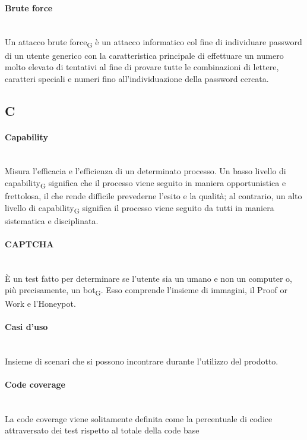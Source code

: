 \paragraph{Brute force}~\smallskip \\
Un attacco brute force\textsubscript{G} è un attacco informatico col fine di individuare password di un utente generico con la caratteristica principale di effettuare un numero molto elevato di tentativi al fine di provare tutte le combinazioni di lettere, caratteri speciali e numeri fino all'individuazione della password cercata.
\newpage
{}
\subsection*{C}
\paragraph{Capability}~\smallskip \\
Misura l'efficacia e l'efficienza di un determinato processo. Un basso livello di capability\textsubscript{G} significa che il processo viene seguito in maniera opportunistica e frettolosa, il che rende difficile prevederne l'esito e la qualità; al contrario, un alto livello di capability\textsubscript{G} significa il processo viene seguito da tutti in maniera sistematica e disciplinata.

\paragraph{CAPTCHA}~\smallskip \\
È un test fatto per determinare se l'utente sia un umano e non un computer o, più precisamente, un bot\textsubscript{G}.
Esso comprende l'insieme di immagini, il Proof or Work e l'Honeypot.

\paragraph{Casi d'uso}~\smallskip \\
Insieme di scenari che si possono incontrare durante l'utilizzo del prodotto.

\paragraph{Code coverage}~\smallskip \\
La code coverage viene solitamente definita come la percentuale di codice attraversato dei test rispetto al totale della code base

